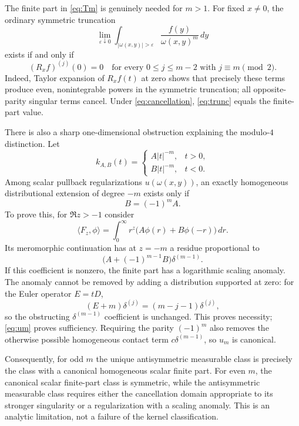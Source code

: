 \documentclass[11pt]{article}
\begin{document}
The finite part in \eqref{eq:Tm} is genuinely needed for $m>1$.  For fixed $x\ne0$, the ordinary symmetric truncation
\begin{equation}\label{eq:trunc}
 \lim_{\varepsilon\downarrow0}
 \int_{|\omega(x,y)|>\varepsilon}\frac{f(y)}{\omega(x,y)^m}\,dy
\end{equation}
exists if and only if
\begin{equation}\label{eq:cancellation}
 (R_xf)^{(j)}(0)=0
 \quad\text{for every }0\le j\le m-2\text{ with }j\equiv m\pmod2.
\end{equation}
Indeed, Taylor expansion of $R_xf(t)$ at zero shows that precisely these terms produce even, nonintegrable powers in the symmetric truncation; all opposite-parity singular terms cancel.  Under \eqref{eq:cancellation}, \eqref{eq:trunc} equals the finite-part value.

There is also a sharp one-dimensional obstruction explaining the modulo-$4$ distinction.  Let
\[
 k_{A,B}(t)=
 \begin{cases}A|t|^{-m},&t>0,\\B|t|^{-m},&t<0.\end{cases}
\]
Among scalar pullback regularizations $u(\omega(x,y))$, an exactly homogeneous distributional extension of degree $-m$ exists only if
\begin{equation}\label{eq:residue-condition}
 B=(-1)^mA.
\end{equation}
To prove this, for $\Re z>-1$ consider
\[
 \langle F_z,\phi\rangle
 =\int_0^\infty r^z\big(A\phi(r)+B\phi(-r)\big)\,dr.
\]
Its meromorphic continuation has at $z=-m$ a residue proportional to
\[
 \big(A+(-1)^{m-1}B\big)\delta^{(m-1)}.
\]
If this coefficient is nonzero, the finite part has a logarithmic scaling anomaly.  The anomaly cannot be removed by adding a distribution supported at zero: for the Euler operator $E=tD$,
\[
 (E+m)\delta^{(j)}=(m-j-1)\delta^{(j)},
\]
so the obstructing $\delta^{(m-1)}$ coefficient is unchanged.  This proves necessity; \eqref{eq:um} proves sufficiency.  Requiring the parity $(-1)^m$ also removes the otherwise possible homogeneous contact term $c\delta^{(m-1)}$, so $u_m$ is canonical.

Consequently, for odd $m$ the unique antisymmetric measurable class is precisely the class with a canonical homogeneous scalar finite part.  For even $m$, the canonical scalar finite-part class is symmetric, while the antisymmetric measurable class requires either the cancellation domain appropriate to its stronger singularity or a regularization with a scaling anomaly.  This is an analytic limitation, not a failure of the kernel classification.
\end{document}
